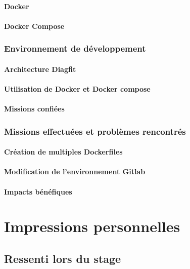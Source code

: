 \subsubsection{Docker}

\subsubsection{Docker Compose}


\subsection{Environnement de développement}
\subsubsection{Architecture Diagfit}

\subsubsection{Utilisation de Docker et Docker compose}

\subsubsection{Missions confiées}


\subsection{Missions effectuées et problèmes rencontrés}
\subsubsection{Création de multiples Dockerfiles}

\subsubsection{Modification de l'environnement Gitlab}

\subsubsection{Impacts bénéfiques}




\chapter{Impressions personnelles}
\section{Ressenti lors du stage}
